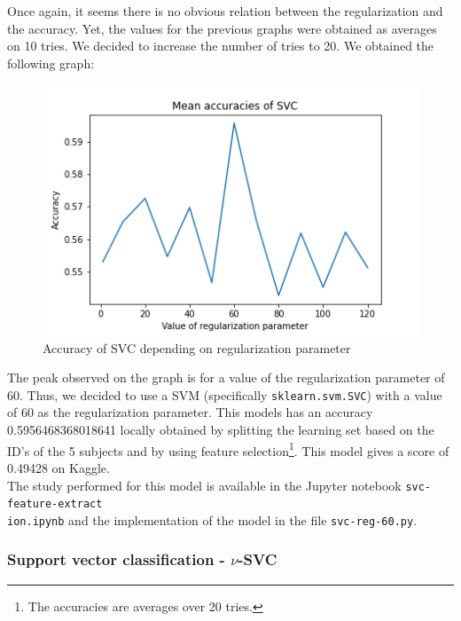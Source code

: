 \documentclass[a4paper, 11pt, oneside]{article}
\begin{document}
Once again, it seems there is no obvious relation between the regularization and the accuracy. Yet, the values for the previous graphs were obtained as averages on 10 tries. We decided to increase the number of tries to 20. We obtained the following graph:
\begin{figure}[H]
\centering
\includegraphics[scale=0.4]{svm/svm_svc_accuracies_4.png}
\caption{Accuracy of SVC depending on regularization parameter}
\end{figure}
The peak observed on the graph is for a value of the regularization parameter of 60. Thus, we decided to use a SVM (specifically \texttt{sklearn.svm.SVC}) with a value of 60 as the regularization parameter. This models has an accuracy 0.5956468368018641 locally obtained by splitting the learning set based on the ID's of the 5 subjects and by using feature selection\footnote{The accuracies are averages over 20 tries.}. This model gives a score of 0.49428 on Kaggle.\\
The study performed for this model is available in the Jupyter notebook \texttt{svc-feature-extract\\ion.ipynb} and the implementation of the model in the file \texttt{svc-reg-60.py}.

\subsubsection{Support vector classification - $\nu$-SVC} \label{subsubsec:nusvc}
\end{document}
